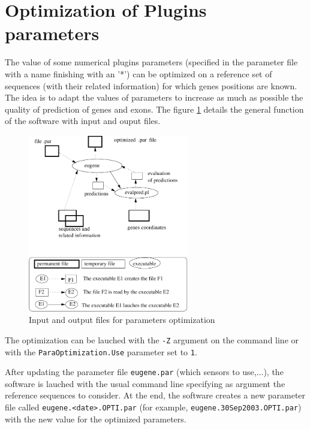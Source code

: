 \documentclass[a4paper,titlepage]{report}
\begin{document}
\section{Optimization of Plugins parameters}

The value of some numerical plugins parameters (specified in the
parameter file with a name finishing with an '*') can be optimized on
a reference set of sequences (with their related information) for
which genes positions are known. The idea is to adapt the values of
parameters to increase as much as possible the quality of prediction
of genes and exons. The figure \ref{fig:ParaOptimization} details the
general function of the software with input and ouput files.

\begin{figure}[htbp]
  \begin{center}
    \includegraphics[width=7cm]{ParaOptimization}
  \end{center}
  \caption{Input and output files for parameters optimization} 
  \label{fig:ParaOptimization}
\end{figure}

The optimization can be lauched with the \texttt{-Z} argument
 on the command line or
with the \texttt{ParaOptimi\-zation.Use} parameter set to \texttt{1}.

After updating the parameter file \texttt{eugene.par} (which sensors
to use,...), the software is lauched with the usual command line
specifying as argument the reference sequences to consider. At the
end, the software creates a new parameter file called
\texttt{eugene.<date>.OPTI.par} (for example,
\texttt{eugene.30Sep\-2003.OPTI.par}) with the new value for the
optimized parameters.
\end{document}
